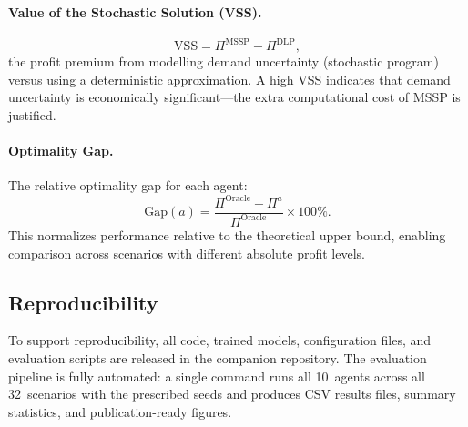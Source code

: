 \paragraph{Value of the Stochastic Solution (VSS).}
\begin{equation}\label{eq:vss}
  \text{VSS} = \Pi^{\text{MSSP}} - \Pi^{\text{DLP}},
\end{equation}
the profit premium from modelling demand uncertainty (stochastic
program) versus using a deterministic approximation. A high VSS
indicates that demand uncertainty is economically significant---the
extra computational cost of MSSP is justified.

\paragraph{Optimality Gap.}
The relative optimality gap for each agent:
\begin{equation}\label{eq:gap}
  \text{Gap}(a) = \frac{\Pi^{\text{Oracle}} - \Pi^{a}}
                       {\Pi^{\text{Oracle}}} \times 100\%.
\end{equation}
This normalizes performance relative to the theoretical upper bound,
enabling comparison across scenarios with different absolute profit
levels.

\subsection{Reproducibility}

To support reproducibility, all code, trained models, configuration
files, and evaluation scripts are released in the companion
repository. The evaluation pipeline is fully automated: a single
command runs all 10~agents across all 32~scenarios with the prescribed
seeds and produces CSV results files, summary statistics, and
publication-ready figures.
